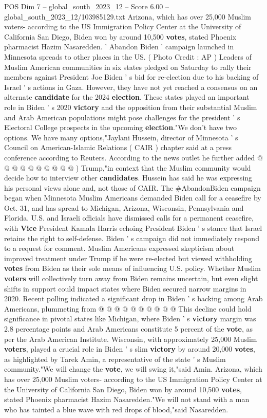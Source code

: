 \begin{textsample}{POS Dim 7 – global\_south\_2023\_12 – Score 6.00 – global\_south\_2023\_12/103985129.txt}  \label{ex:f7_pos_260}
Arizona, which has over 25,000 Muslim voters- according to the US Immigration Policy Center at the University of California San Diego, Biden won by around 10,500 \textbf{votes}, stated Phoenix pharmacist Hazim Nasaredden. ' Abandon Biden ' campaign launched in Minnesota spreads to other places in the US. ( Photo Credit : AP ) Leaders of Muslim American communities in six states pledged on Saturday to rally their members against President Joe Biden ' s bid for re-election due to his backing of Israel ' s actions in Gaza.
However, they have not yet reached a consensus on an alternate \textbf{candidate} for the 2024 \textbf{election}.
These states played an important role in Biden ' s 2020 \textbf{victory} and the opposition from their substantial Muslim and Arab American populations might pose challenges for the president ' s Electoral College prospects in the upcoming \textbf{election}."We don't have two options.
We have many options,"Jaylani Hussein, director of Minnesota ' s Council on American-Islamic Relations ( CAIR ) chapter said at a press conference according to Reuters.
According to the news outlet he further added @ @ @ @ @ @ @ @ @ @ ) Trump,"in context that the Muslim community would decide how to interview other \textbf{candidates}.
Hussein has said he was expressing his personal views alone and, not those of CAIR.
The \#AbandonBiden campaign began when Minnesota Muslim Americans demanded Biden call for a ceasefire by Oct. 31, and has spread to Michigan, Arizona, Wisconsin, Pennsylvania and Florida.
U.S. and Israeli officials have dismissed calls for a permanent ceasefire, with \textbf{Vice} President Kamala Harris echoing President Biden ' s stance that Israel retains the right to self-defense.
Biden ' s campaign did not immediately respond to a request for comment.
Muslim Americans expressed skepticism about improved treatment under Trump if he were re-elected but viewed withholding \textbf{votes} from Biden as their sole means of influencing U.S. policy.
Whether Muslim \textbf{voters} will collectively turn away from Biden remains uncertain, but even slight shifts in support could impact states where Biden secured narrow margins in 2020.
Recent polling indicated a significant drop in Biden ' s backing among Arab Americans, plummeting from @ @ @ @ @ @ @ @ @ @ This decline could hold significance in pivotal states like Michigan, where Biden ' s \textbf{victory} margin was 2.8 percentage points and Arab Americans constitute 5 percent of the \textbf{vote}, as per the Arab American Institute.
Wisconsin, with approximately 25,000 Muslim \textbf{voters}, played a crucial role in Biden ' s slim \textbf{victory} by around 20,000 \textbf{votes}, as highlighted by Tarek Amin, a representative of the state ' s Muslim community."We will change the \textbf{vote}, we will swing it,"said Amin.
Arizona, which has over 25,000 Muslim voters- according to the US Immigration Policy Center at the University of California San Diego, Biden won by around 10,500 \textbf{votes}, stated Phoenix pharmacist Hazim Nasaredden."We will not stand with a man who has tainted a blue wave with red drops of blood,"said Nasaredden.


\end{textsample}
